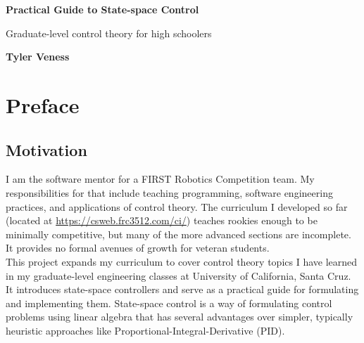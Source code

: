 \documentclass[10pt,conference,compsoc]{IEEEtran}
\begin{document}


\begin{titlepage}
  \begin{center}
    \vspace*{1cm}

    \Huge
    \textbf{Practical Guide to State-space Control}

    \vspace{0.5cm}
    \LARGE
    Graduate-level control theory for high schoolers

    \vspace{1.5cm}

    \textbf{Tyler Veness}

    \vfill

    \vspace{0.8cm}

  \end{center}

  \vfill


  \vspace{0.8cm}
\end{titlepage}
\thispagestyle{empty}  %

\tableofcontents
\listoffigures
\listoftables
\clearpage


\section{Preface}

\subsection{Motivation}

I am the software mentor for a FIRST Robotics Competition team. My
responsibilities for that include teaching programming, software engineering
practices, and applications of control theory. The curriculum I developed so far
(located at \url{https://csweb.frc3512.com/ci/}) teaches rookies enough to be
minimally competitive, but many of the more advanced sections are incomplete. It
provides no formal avenues of growth for veteran students. \\

This project expands my curriculum to cover control theory topics I have learned
in my graduate-level engineering classes at University of California,
Santa Cruz. It introduces state-space controllers and serve as a practical guide
for formulating and implementing them. State-space control is a way of
formulating control problems using linear algebra that has several advantages
over simpler, typically heuristic approaches like
Proportional-Integral-Derivative (PID). \\
\end{document}
